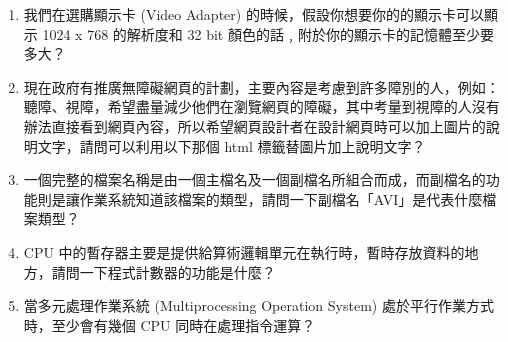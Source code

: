 \documentclass[12pt,a4paper]{report}
\begin{document}
\begin{CJK}{UTF8}{bkai}
\begin{enumerate}
\item 我們在選購顯示卡 (Video Adapter) 的時候，假設你想要你的的顯示卡可以顯示 1024 x 768 的解析度和 32 bit 顏色的話﹐附於你的顯示卡的記憶體至少要多大？
\item 現在政府有推廣無障礙網頁的計劃，主要內容是考慮到許多障別的人，例如：聽障、視障，希望盡量減少他們在瀏覽網頁的障礙，其中考量到視障的人沒有辦法直接看到網頁內容，所以希望網頁設計者在設計網頁時可以加上圖片的說明文字，請問可以利用以下那個 html 標籤替圖片加上說明文字？
\item 一個完整的檔案名稱是由一個主檔名及一個副檔名所組合而成，而副檔名的功能則是讓作業系統知道該檔案的類型，請問一下副檔名「AVI」是代表什麼檔案類型？
\item CPU 中的暫存器主要是提供給算術邏輯單元在執行時，暫時存放資料的地方，請問一下程式計數器的功能是什麼？
\item 當多元處理作業系統 (Multiprocessing Operation System) 處於平行作業方式時，至少會有幾個 CPU 同時在處理指令運算？
  \begin{optionlist}

\end{optionlist}
\end{enumerate}
\end{CJK}
\end{document}

